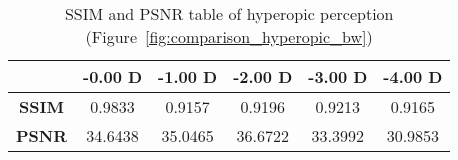 
\begin{table}[!b]
	\centering
	\label{table:metrics_hyperopic_bw}
	\caption[SSIM and PSNR table of hyperopic perception (Figure~\ref{fig:comparison_hyperopic_bw})]{SSIM and PSNR table of hyperopic perception (Figure~\ref{fig:comparison_hyperopic_bw})}

	\begin{tabular}{cccccc}
	{\bf }                          & {\bf -0.00 D} & {\bf -1.00 D} & {\bf -2.00 D} & {\bf -3.00 D} & {\bf -4.00 D} \\ \hline
	\multicolumn{1}{c|}{{\bf SSIM}} & 0.9833  		& 0.9157  		& 0.9196  		& 0.9213  		& 0.9165  		\\
	\multicolumn{1}{c|}{{\bf PSNR}} & 34.6438 		& 35.0465 		& 36.6722 		& 33.3992 		& 30.9853
	\end{tabular}
\end{table}